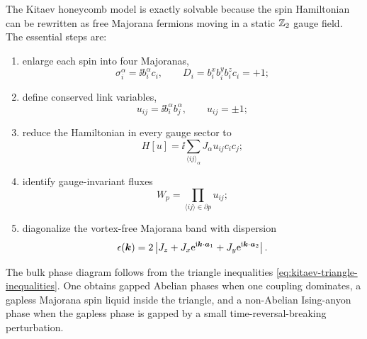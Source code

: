 The Kitaev honeycomb model is exactly solvable because the spin Hamiltonian can
be rewritten as free Majorana fermions moving in a static \(\mathbb{Z}_2\) gauge field.
The essential steps are:
\begin{enumerate}[label=(\roman*)]
    \item enlarge each spin into four Majoranas,
    \begin{equation}
    \label{eq:kitaev-summary-majorana-rep}
        \sigma_i^\alpha=\ii b_i^\alpha c_i,
        \qquad
        D_i=b_i^xb_i^yb_i^zc_i=+1;
    \end{equation}
    \item define conserved link variables,
    \begin{equation}
    \label{eq:kitaev-summary-link-variable}
        u_{ij}=\ii b_i^\alpha b_j^\alpha,
        \qquad
        u_{ij}=\pm1;
    \end{equation}
    \item reduce the Hamiltonian in every gauge sector to
    \begin{equation}
    \label{eq:kitaev-summary-free-majorana}
        H[u]=\ii\sum_{\langle ij\rangle_\alpha}J_\alpha u_{ij}c_i c_j;
    \end{equation}
    \item identify gauge-invariant fluxes
    \begin{equation}
    \label{eq:kitaev-summary-flux}
        W_p=\prod_{\langle ij\rangle\in\partial p}u_{ij};
    \end{equation}
    \item diagonalize the vortex-free Majorana band with dispersion
    \begin{equation}
    \label{eq:kitaev-summary-dispersion}
        \epsilon(\bm k)=2\left|J_z+J_x\mathrm{e}^{\mathrm{i}\bm k\cdot\bm a_1}
        +J_y\mathrm{e}^{\mathrm{i}\bm k\cdot\bm a_2}\right| .
    \end{equation}
\end{enumerate}
The bulk phase diagram follows from the triangle inequalities
\cref{eq:kitaev-triangle-inequalities}.  One obtains gapped Abelian phases when
one coupling dominates, a gapless Majorana spin liquid inside the triangle, and
a non-Abelian Ising-anyon phase when the gapless phase is gapped by a
small time-reversal-breaking perturbation.
